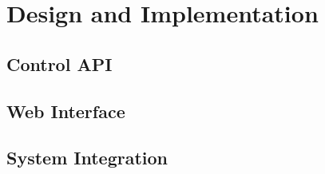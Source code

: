 \section{Design and Implementation}

\subsection{Control API}


\subsection{Web Interface}

\subsection{System Integration}